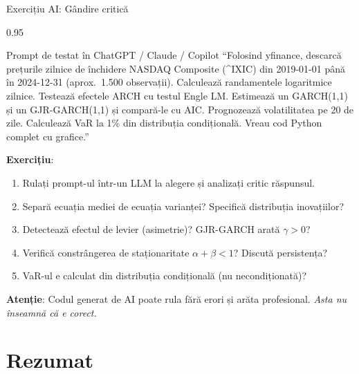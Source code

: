 \documentclass[9pt, aspectratio=169, t]{beamer}
\begin{document}
\begin{frame}{Exercițiu AI: Gândire critică}
    \begin{cminipage}{0.95\textwidth}
    \vspace{-3mm}
    \begin{block}{\footnotesize Prompt de testat în ChatGPT / Claude / Copilot}
        {\footnotesize
        ``Folosind yfinance, descarcă prețurile zilnice de închidere NASDAQ Composite (\^{}IXIC) din 2019-01-01 până în 2024-12-31 (aprox.\ 1.500 observații). Calculează randamentele logaritmice zilnice. Testează efectele ARCH cu testul Engle LM. Estimează un GARCH(1,1) și un GJR-GARCH(1,1) și compară-le cu AIC. Prognozează volatilitatea pe 20 de zile. Calculează VaR la 1\% din distribuția condițională. Vreau cod Python complet cu grafice.''
        }
    \end{block}
    \vspace{-2mm}
    {\footnotesize
    \textbf{Exercițiu}:
    \begin{enumerate}\setlength{\itemsep}{0pt}
        \item Rulați prompt-ul într-un LLM la alegere și analizați critic răspunsul.
        \item Separă ecuația mediei de ecuația varianței? Specifică distribuția inovațiilor?
        \item Detectează efectul de levier (asimetrie)? GJR-GARCH arată $\gamma > 0$?
        \item Verifică constrângerea de staționaritate $\alpha + \beta < 1$? Discută persistența?
        \item VaR-ul e calculat din distribuția condițională (nu necondiționată)?
    \end{enumerate}
    }
    \vspace{-2mm}
    \begin{alertblock}{}
        {\footnotesize \textbf{Atenție}: Codul generat de AI poate rula fără erori și arăta profesional. \textit{Asta nu înseamnă că e corect.}}
    \end{alertblock}
    \end{cminipage}
\end{frame}

\section{Rezumat}
\end{document}
